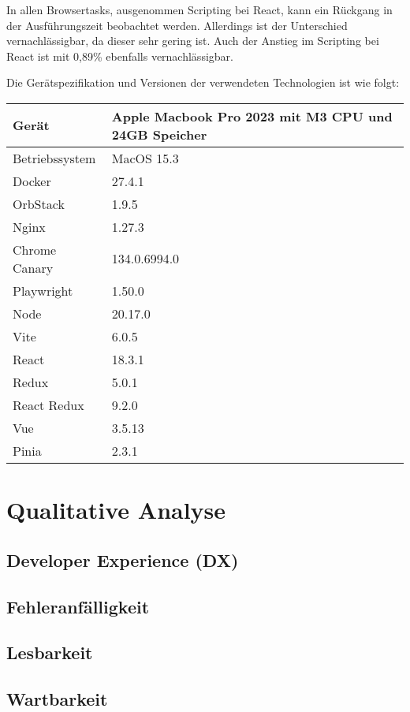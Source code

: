 In allen Browsertasks, ausgenommen Scripting bei React, kann ein Rückgang in der Ausführungszeit beobachtet werden. Allerdings ist der Unterschied vernachlässigbar, da dieser sehr gering ist. Auch der Anstieg im Scripting bei React ist mit 0,89\% ebenfalls vernachlässigbar.

Die Gerätspezifikation und Versionen der verwendeten Technologien ist wie folgt:

\begin{center}
  \begin{tabular}{ | m{5cm}| m{5cm} | } 
    \hline
    Gerät & Apple Macbook Pro 2023 mit M3 CPU und 24GB Speicher \\ 
    \hline
    Betriebssystem & MacOS 15.3 \\ 
    \hline
    Docker & 27.4.1 \\ 
    \hline
    OrbStack & 1.9.5 \\ 
    \hline
    Nginx & 1.27.3 \\ 
    \hline
    Chrome Canary & 134.0.6994.0 \\ 
    \hline
    Playwright & 1.50.0 \\ 
    \hline
    Node & 20.17.0 \\ 
    \hline
    Vite & 6.0.5 \\ 
    \hline
    React & 18.3.1 \\ 
    \hline
    Redux & 5.0.1 \\ 
    \hline
    React Redux & 9.2.0 \\ 
    \hline
    Vue & 3.5.13 \\ 
    \hline
    Pinia & 2.3.1 \\ 
    \hline
  \end{tabular}
\end{center}

\section{Qualitative Analyse}

\subsection{Developer Experience (DX)}
\subsection{Fehleranfälligkeit}
\subsection{Lesbarkeit}
\subsection{Wartbarkeit}

